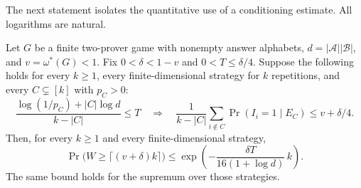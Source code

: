 The next statement isolates the quantitative use of a conditioning
estimate. All logarithms are natural.
\begin{proposition}
\label{prop:conditioning-to-tail}
Let $G$ be a finite two-prover game with nonempty answer alphabets,
$d=|\mathcal A||\mathcal B|$, and $v=\omega^*(G)<1$.
Fix $0<\delta<1-v$ and $0<T\le\delta/4$. Suppose the following holds for
every $k\ge1$, every finite-dimensional strategy for $k$ repetitions,
and every $C\subsetneq[k]$
with $p_C>0$:
\begin{equation}\label{eq:threshold-input}
 \frac{\log(1/p_C)+|C|\log d}{k-|C|}\le T
 \quad\Longrightarrow\quad
 \frac{1}{k-|C|}\sum_{i\notin C}\Pr(I_i=1\mid E_C)
 \le v+\delta/4.
\end{equation}
Then, for every $k\ge1$ and every finite-dimensional strategy,
\begin{equation}\label{eq:generic-threshold-rate}
 \Pr\bigl(W\ge\lceil(v+\delta)k\rceil\bigr)
 \le \exp\left(-\frac{\delta T}{16(1+\log d)}\,k\right).
\end{equation}
The same bound holds for the supremum over those strategies.
\end{proposition}
